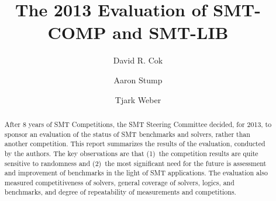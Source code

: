 \documentclass[smallcondensed]{svjour3}
\begin{document}
\title{The 2013 Evaluation of SMT-COMP and SMT-LIB}


\author{
David R. Cok 
\and  
Aaron Stump
\and  
Tjark Weber
}

%


\date{}
\maketitle

\begin{abstract}
After 8 years of SMT Competitions, the SMT Steering Committee decided,
for 2013, to sponsor an evaluation of the status of SMT benchmarks and
solvers, rather than another competition.  This report summarizes the
results of the evaluation, conducted by the authors.  The key
observations are that (1)~the competition results are quite sensitive
to randomness and (2)~the most significant need for the future is
assessment and improvement of benchmarks in the light of SMT
applications.  The evaluation also measured competitiveness of
solvers, general coverage of solvers, logics, and benchmarks, and
degree of repeatability of measurements and competitions.
\end{abstract}
\end{document}
